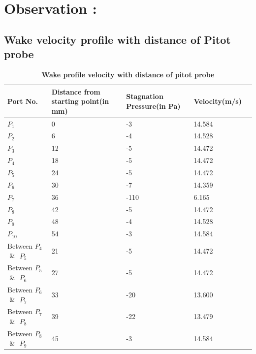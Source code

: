 \documentclass[12pt,a4paper]{article}
\begin{document}
\section{Observation :}


\subsection{Wake velocity profile with distance of Pitot  probe  }
\begin{table}[ht]
\centering
\caption{\textbf{Wake profile velocity with distance of pitot probe}}
\vspace{2mm}

\begin{tabular}{|p{20mm}|p{20mm}|p{20mm}|p{25mm}|p{25mm}|} 
 \hline
Port No. & Distance from starting point(in mm) & Stagnation Pressure(in Pa) & Velocity(m/s) \\ [0.1ex] 
 \hline
$P_1$ & 0 & -3  & 14.584 \\ 
 \hline
$P_2$ & 6 & -4 & 14.528  \\
 \hline
$P_3$ & 12 & -5 & 14.472  \\
 \hline
 $P_4$ & 18 & -5 & 14.472  \\
 \hline
$P_5$ & 24 & -5 & 14.472  \\
 \hline
$P_6$ & 30 & -7 & 14.359 \\ 
 \hline
$P_7$ & 36 & -110 & 6.165 \\ 
 \hline
$P_8$ & 42 & -5 & 14.472\\
 \hline
$P_9$ & 48 & -4 & 14.528\\
 \hline
$P_{10}$ & 54 & -3 & 14.584\\ 
 \hline 
Between $P_{4}$ $\And$ $P_{5}$ & 21 & -5 & 14.472\\ 
 \hline
Between $P_{5}$ $\And$ $P_{6}$ & 27 & -5 & 14.472\\ 
 \hline
Between $P_{6}$ $\And$ $P_{7}$ & 33 & -20 & 13.600\\ 
 \hline
Between $P_{7}$ $\And$ $P_{8}$ & 39 & -22 & 13.479\\ 
 \hline
Between $P_{8}$ $\And$ $P_{9}$ & 45 & -3 & 14.584\\ 
 \hline
\end{tabular}

\end{table}
\end{document}
